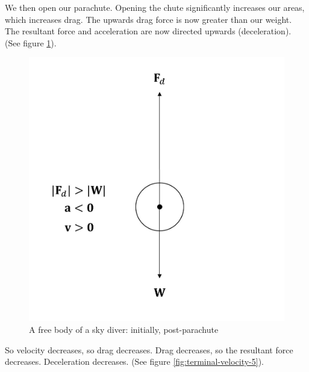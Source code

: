 \FloatBarrier
We then open our parachute. Opening the chute significantly increases our areas, which increases drag. The upwards drag force is now greater than our weight. The resultant force and acceleration are now directed upwards (deceleration). (See figure \ref{fig:terminal-velocity-4}). 
\begin{figure}[h!]
    \centering
    \includegraphics[scale=0.3]{notes/images/Terminal-Velocity-4.JPG}
    \caption{A free body of a sky diver: initially, post-parachute }
    \label{fig:terminal-velocity-4}
\end{figure}
\FloatBarrier
So velocity decreases, so drag decreases. Drag decreases, so the resultant force decreases. Deceleration decreases. (See figure \ref{fig:terminal-velocity-5}).
